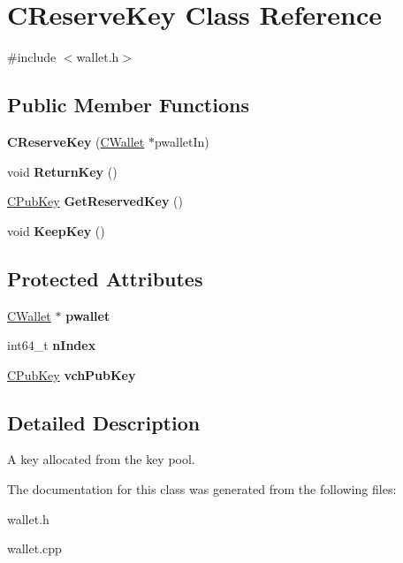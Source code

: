 \hypertarget{class_c_reserve_key}{}\section{C\+Reserve\+Key Class Reference}
\label{class_c_reserve_key}


{\ttfamily \#include $<$wallet.\+h$>$}

\subsection*{Public Member Functions}
\begin{DoxyCompactItemize}
\item 
\mbox{\label{class_c_reserve_key_ab5c15654a1e28bf5f2852512381d07c4}} 
{\bfseries C\+Reserve\+Key} (\mbox{\hyperlink{class_c_wallet}{C\+Wallet}} $\ast$pwallet\+In)
\item 
\mbox{\label{class_c_reserve_key_af7b0a61f8c70c8146e42e82b4e227204}} 
void {\bfseries Return\+Key} ()
\item 
\mbox{\label{class_c_reserve_key_a22d52b112c9c1035c7c49e78a8a2a732}} 
\mbox{\hyperlink{class_c_pub_key}{C\+Pub\+Key}} {\bfseries Get\+Reserved\+Key} ()
\item 
\mbox{\label{class_c_reserve_key_a493d06f41ca9571f2a42c8581a3952d8}} 
void {\bfseries Keep\+Key} ()
\end{DoxyCompactItemize}
\subsection*{Protected Attributes}
\begin{DoxyCompactItemize}
\item 
\mbox{\label{class_c_reserve_key_aab8a4052c0b9a4337248ae53e77c6115}} 
\mbox{\hyperlink{class_c_wallet}{C\+Wallet}} $\ast$ {\bfseries pwallet}
\item 
\mbox{\label{class_c_reserve_key_a16d05c9be039eb772f2daf412cca1991}} 
int64\+\_\+t {\bfseries n\+Index}
\item 
\mbox{\label{class_c_reserve_key_a2b252444577b6aca8b497c2207ff17a4}} 
\mbox{\hyperlink{class_c_pub_key}{C\+Pub\+Key}} {\bfseries vch\+Pub\+Key}
\end{DoxyCompactItemize}


\subsection{Detailed Description}
A key allocated from the key pool. 

The documentation for this class was generated from the following files\+:\begin{DoxyCompactItemize}
\item 
wallet.\+h\item 
wallet.\+cpp\end{DoxyCompactItemize}
